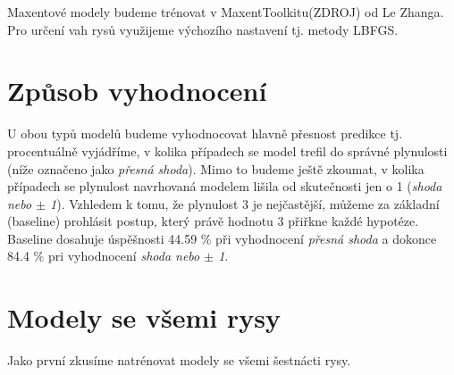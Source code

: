 \documentclass[12pt,a4paper]{report}
\begin{document}
Maxentové modely budeme trénovat v MaxentToolkitu(ZDROJ) od Le Zhanga. Pro určení vah rysů využijeme výchozího nastavení tj. metody LBFGS.


\section{Způsob vyhodnocení}
U obou typů modelů budeme vyhodnocovat hlavně přesnost predikce tj. procentuálně vyjádříme, v kolika případech se model trefil do správné plynulosti (níže označeno jako \textit{přesná shoda}). Mimo to budeme ještě zkoumat, v kolika případech se plynulost navrhovaná modelem lišila od skutečnosti jen o 1 (\textit{shoda nebo $\pm$ 1}). Vzhledem k tomu, že plynulost 3 je nejčastější, můžeme za základní (baseline) prohlásit postup, který právě hodnotu 3 přiřkne každé hypotéze. Baseline dosahuje úspěšnosti 44.59 \% při vyhodnocení \textit{přesná shoda} a dokonce 84.4 \% pri vyhodnocení \textit{shoda nebo $\pm$ 1}.




\section{Modely se všemi rysy}
Jako první zkusíme natrénovat modely se všemi šestnácti rysy.
\end{document}
